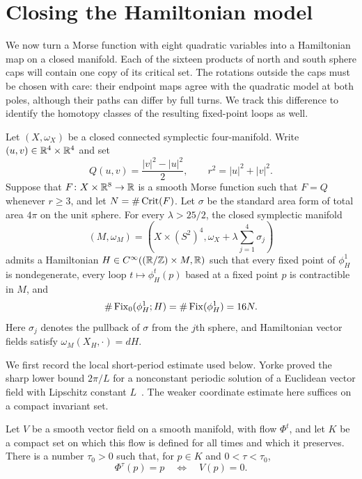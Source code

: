 \section{Closing the Hamiltonian model}
\label{sec:hamiltonian}

We now turn a Morse function with eight quadratic variables into a
Hamiltonian map on a closed manifold.  Each of the sixteen products of
north and south sphere caps will contain one copy of its critical set.
The rotations outside the caps must be chosen with care: their endpoint
maps agree with the quadratic model at both poles, although their paths
can differ by full turns. We track this difference to identify the
homotopy classes of the resulting fixed-point loops as well.

\begin{proposition}\label{prop:cap-transfer}
Let $(X,\omega_X)$ be a closed connected symplectic four-manifold. Write
$(u,v)\in\mathbb R^4\times\mathbb R^4$ and set
\[
 Q(u,v)=\frac{|v|^2-|u|^2}{2},
 \qquad r^2=|u|^2+|v|^2.
\]
Suppose that $F\colon X\times\mathbb R^8\to\mathbb R$ is a smooth Morse function
such that $F=Q$ whenever $r\ge3$, and let $N=\#\operatorname{Crit}(F)$.
Let $\sigma$ be the standard area form of total area $4\pi$ on the unit
sphere. For every $\lambda>25/2$, the closed symplectic manifold
\[
 (M,\omega_M)=
 \left(X\times(S^2)^4,
 \omega_X+\lambda\sum_{j=1}^4\sigma_j\right)
\]
admits a Hamiltonian $H\in C^\infty((\mathbb R/\mathbb Z)\times M,\mathbb R)$ such
that every fixed point of $\phi_H^1$ is nondegenerate, every loop
$t\mapsto\phi_H^t(p)$ based at a fixed point $p$ is contractible in
$M$, and
\[
 \#\operatorname{Fix}_0(\phi_H^1;H)=\#\operatorname{Fix}(\phi_H^1)=16N.
\]
Here $\sigma_j$ denotes the pullback of $\sigma$ from the $j$th sphere,
and Hamiltonian vector fields satisfy $\omega_M(X_H,\cdot)=dH$.
\end{proposition}

We first record the local short-period estimate used below. Yorke proved
the sharp lower bound $2\pi/L$ for a nonconstant periodic solution of a
Euclidean vector field with Lipschitz constant $L$~\cite{Yorke1969}.
The weaker coordinate estimate here suffices on a compact invariant set.

\begin{lemma}\label{lem:short-period}
Let $V$ be a smooth vector field on a smooth manifold, with flow
$\Phi^t$, and let $K$ be a compact set on which this flow is defined
for all times and which it preserves. There is a number $\tau_0>0$
such that, for $p\in K$ and $0<\tau<\tau_0$,
\[
 \Phi^\tau(p)=p\quad\Longleftrightarrow\quad V(p)=0.
\]
\end{lemma}

